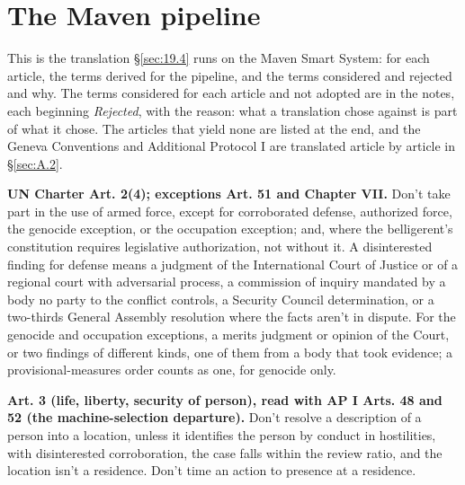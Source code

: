 \section{The Maven pipeline}
\label{sec:A.1}
This is the translation \S\ref{sec:19.4} runs on the Maven Smart System: for each article, the terms derived for the pipeline, and the terms considered and rejected and why. The terms considered for each article and not adopted are in the notes, each beginning \emph{Rejected}, with the reason: what a translation chose against is part of what it chose. The articles that yield none are listed at the end, and the Geneva Conventions and Additional Protocol I are translated article by article in \S\ref{sec:A.2}.


\textbf{UN Charter Art. 2(4); exceptions Art. 51 and Chapter VII.} Don't take part in the use of armed force, except for corroborated defense, authorized force, the genocide exception, or the occupation exception; and, where the belligerent's constitution requires legislative authorization, not without it. A disinterested finding for defense means a judgment of the International Court of Justice or of a regional court with adversarial process, a commission of inquiry mandated by a body no party to the conflict controls, a Security Council determination, or a two-thirds General Assembly resolution where the facts aren't in dispute. For the genocide and occupation exceptions, a merits judgment or opinion of the Court, or two findings of different kinds, one of them from a body that took evidence; a provisional-measures order counts as one, for genocide only.

\textbf{Art. 3 (life, liberty, security of person), read with AP I Arts. 48 and 52 (the machine-selection departure).} Don't resolve a description of a person into a location, unless it identifies the person by conduct in hostilities, with disinterested corroboration, the case falls within the review ratio, and the location isn't a residence. Don't time an action to presence at a residence.

